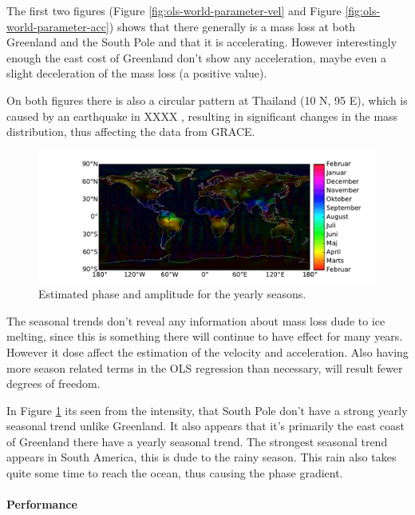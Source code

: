 The first two figures (Figure \ref{fig:ols-world-parameter-vel} and Figure \ref{fig:ols-world-parameter-acc}) shows that there generally is a mass loss at both Greenland and the South Pole and that it is accelerating. However interestingly enough the east cost of Greenland don't show any acceleration, maybe even a slight deceleration of the mass loss (a positive value).

On both figures there is also a circular pattern at Thailand (10 N, 95 E), which is caused by an earthquake in XXXX , resulting in significant changes in the mass distribution, thus affecting the data from GRACE.
\begin{figure}[H]
	\centering
	\includegraphics[width=\textwidth]{figures/ols-world-parameter-year}
	\caption{Estimated phase and amplitude for the yearly seasons.}
	\label{fig:ols-world-parameter-year}
\end{figure}

The seasonal trends don't reveal any information about mass loss dude to ice melting, since this is something there will continue to have effect for many years. However it dose affect the estimation of the velocity and acceleration. Also having more season related terms in the OLS regression than necessary, will result fewer degrees of freedom.

In Figure \ref{fig:ols-world-parameter-year} its seen from the intensity, that South Pole don't have a strong yearly seasonal trend unlike Greenland. It also appears that it's primarily the east coast of Greenland there have a yearly seasonal trend. The strongest seasonal trend appears in South America, this is dude to the rainy season. This rain also takes quite some time to reach the ocean, thus causing the phase gradient.

\paragraph{Performance} 

